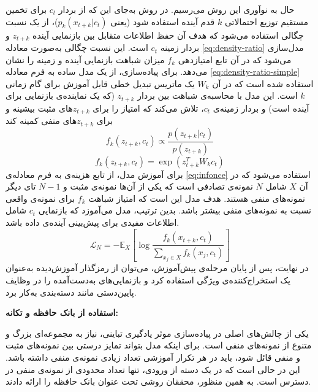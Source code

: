 حال به نوآوری این روش می‌رسیم. در روش 
به‌جای این که از بردار $c_t$
برای تخمین مستقیم توزیع احتمالاتی $k$ قدم آینده استفاده شود
(یعنی $p_k(x_{t+k}|c_t)$)،
از یک نسبت چگالی
استفاده می‌شود که هدف آن حفظ اطلاعات متقابل بین بازنمایی آینده
$z_{t+k}$ و بردار زمینه $c_t$ است.
این نسبت چگالی به‌صورت معادله \ref{eq:density-ratio} مدل‌سازی می‌شود
که در آن تابع امتیازدهی $f_k$
میزان شباهت بازنمایی آینده و زمینه را نشان می‌دهد. برای پیاده‌سازی، از یک مدل ساده به فرم
معادله \ref{eq:density-ratio-simple}
استفاده شده است که در آن $W_k$
یک ماتریس تبدیل خطی قابل آموزش برای گام زمانی $k$ است.
این مدل با محاسبه‌ی شباهت بین بردار
$z_{t+k}$
(که یک نماینده‌ی بازنمایی برای آینده است)
و بردار زمینه‌ی $c_t$،
تلاش می‌کند که امتیاز را برای
$z_{t+k}$های مثبت بیشینه
و برای $z_{t+k}$های منفی کمینه کند
\begin{equation}
\label{eq:density-ratio}
f_k(z_{t+k}, c_t) \propto \frac{p(z_{t+k}|c_t)}{p(z_{t+k})}
\end{equation}
\begin{equation}
\label{eq:density-ratio-simple}
f_k(z_{t+k}, c_t) = \exp \left( z_{t+k}^T W_k c_t \right)
\end{equation}
برای آموزش مدل، از تابع هزینه‌ی
 به فرم معادله‌ی \ref{eq:infonce}
استفاده می‌شود که در آن $X$ شامل $N$
نمونه‌ی تصادفی است که یکی از آن‌ها نمونه‌ی مثبت و $N-1$
تای دیگر نمونه‌های منفی هستند. هدف مدل این است که امتیاز شباهت $f_k$
برای نمونه‌ی واقعی نسبت به نمونه‌های منفی بیشتر باشد. بدین ترتیب، مدل می‌آموزد که بازنمایی $c_t$
شامل اطلاعات مفیدی برای پیش‌بینی آینده‌ی داده باشد.
\begin{equation}
\label{eq:infonce}
\mathcal{L}_N = - \mathbb{E}_X \left[ \log \frac{f_k(x_{t+k}, c_t)}{\sum_{x_j \in X} f_k(x_j, c_t)} \right]
\end{equation}
در نهایت، پس از پایان مرحله‌ی پیش‌‌آموزش، می‌توان از رمزگذار آموزش‌دیده به‌عنوان یک استخراج‌کننده‌ی ویژگی استفاده کرد و بازنمایی‌های به‌دست‌آمده را در وظایف پایین‌دستی مانند دسته‌بندی به‌کار برد.\newline

\noindent\textbf{استفاده از بانک حافظه و تکانه:}

یکی از چالش‌های اصلی در پیاده‌سازی موثر یادگیری تباینی، نیاز به مجموعه‌ای بزرگ و متنوع از نمونه‌های منفی است. برای اینکه مدل بتواند تمایز درستی بین نمونه‌های مثبت و منفی قائل شود، باید در هر تکرار آموزشی تعداد زیادی نمونه‌ی منفی داشته باشد. این در حالی است که در یک دسته از ورودی، تنها تعداد محدودی از نمونه‌ی منفی در دسترس است. به همین منظور، محققان روشی تحت عنوان
بانک حافظه\cite{wu2018unsupervised}
را ارائه دادند.


